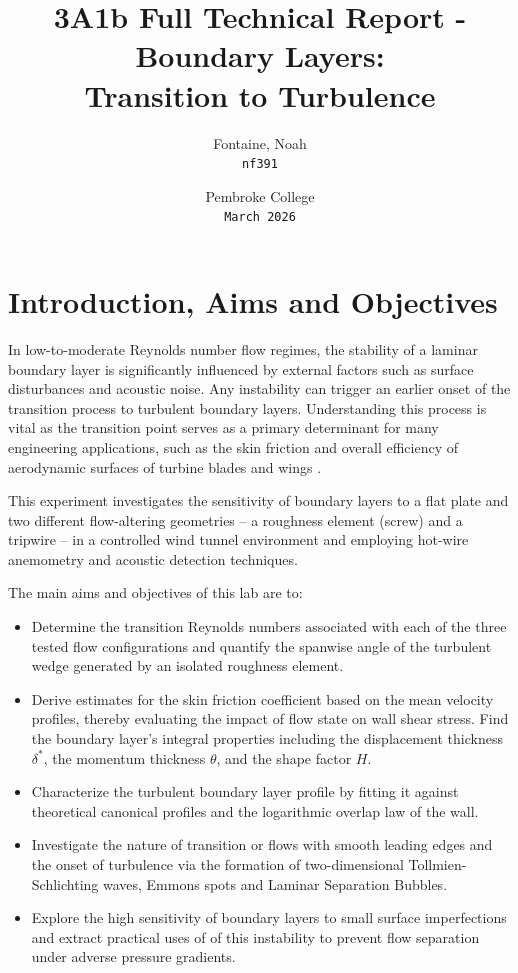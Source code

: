 \documentclass{article}
\title{\textbf{3A1b Full Technical Report - Boundary Layers: \\ Transition to Turbulence}}
\author{
  Fontaine, Noah\\
  \texttt{nf391}
  \and
  Pembroke College\\
  \texttt{March 2026}}
\date{}
\begin{document}
\maketitle

\section{Introduction, Aims and Objectives}

In low-to-moderate Reynolds number flow regimes, the stability of a laminar boundary layer is significantly influenced by external factors such as surface disturbances and acoustic noise. Any instability can trigger an earlier onset of the transition process to turbulent boundary layers. Understanding this process is vital as the transition point serves as a primary determinant for many engineering applications, such as the skin friction and overall efficiency of aerodynamic surfaces of turbine blades and wings \cite{nasa_boundary_layer}.

This experiment investigates the sensitivity of boundary layers to a flat plate and two different flow-altering geometries -- a roughness element (screw) and a tripwire -- in a controlled wind tunnel environment and employing hot-wire anemometry and acoustic detection techniques.

The main aims and objectives of this lab are to:
\begin{itemize}[itemsep=0.1pt]
    \vspace{-6pt}
    \item Determine the transition Reynolds numbers associated with each of the three tested flow configurations and quantify the spanwise angle of the turbulent wedge generated by an isolated roughness element.
    \item Derive estimates for the skin friction coefficient based on the mean velocity profiles, thereby evaluating the impact of flow state on wall shear stress. Find the boundary layer's integral properties including the displacement thickness $\delta^*$, the momentum thickness $\theta$, and the shape factor $H$.
    \item Characterize the turbulent boundary layer profile by fitting it against theoretical canonical profiles and the logarithmic overlap law of the wall.
    \item Investigate the nature of transition or flows with smooth leading edges and the onset of turbulence via the formation of two-dimensional Tollmien-Schlichting waves, Emmons spots and Laminar Separation Bubbles.
    \item Explore the high sensitivity of boundary layers to small surface imperfections and extract practical uses of of this instability to prevent flow separation under adverse pressure gradients.
\end{itemize}
\end{document}
